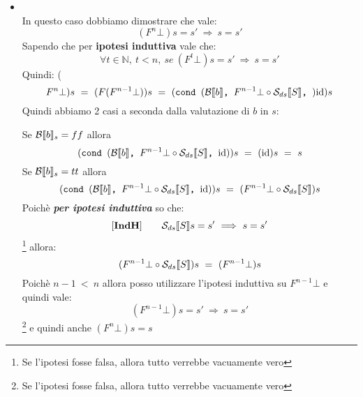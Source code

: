 {\begin{itemize}
\begin{itemize}
    \item {} \\
    In questo caso dobbiamo dimostrare che vale:
    \[ (F^{n}\bot)s=s'~\Longrightarrow~s=s' \]
    Sapendo che per \textbf{ipotesi induttiva} vale che:
    \[ \forall t\in\mathbb{N},~t<n,~se~(F^{t}\bot)s=s'~\Longrightarrow~s=s' \]
    Quindi:
   (\[ F^{n}\bot)s~=~(F(F^{n-1}\bot))s~=~(\cond{b}{F^{n-1}\bot \circ \Sds}
    {\idDS})s \]
    Quindi abbiamo 2 casi a seconda dalla valutazione di $b$ in $s$:

    \subitem[FALSE] Se $\mathcal{B}{}\llbracket b \rrbracket_s=ff$ allora \[ (\mbox{\normalfont{\texttt{cond }}} (\mathcal{B}{}\llbracket b \rrbracket \textrm{\normalfont{\texttt{, }}} F^{n-1}\bot \circ \mathcal{S}_{ds}\llbracket S \rrbracket \textrm{\normalfont{\texttt{, }}} \textrm{\normalfont{id}}))s~=~(\textrm{\normalfont{id}})s~=~s \]
    \subitem[TRUE] Se $\mathcal{B}{}\llbracket b \rrbracket_s=tt$ allora \[ (\mbox{\normalfont{\texttt{cond }}} (\mathcal{B}{}\llbracket b \rrbracket \textrm{\normalfont{\texttt{, }}} F^{n-1}\bot \circ \mathcal{S}_{ds}\llbracket S \rrbracket \textrm{\normalfont{\texttt{, }}} \textrm{\normalfont{id}}))s~=~(F^{n-1}\bot \circ \mathcal{S}_{ds}\llbracket S \rrbracket)s \]
    Poichè \textit{\textbf{per ipotesi induttiva}} so che: 
    \[ \mathbf{[IndH]}\qquad \mathcal{S}_{ds}\llbracket S \rrbracket{}s=s'~\Longrightarrow~s=s' \]\footnote{Se l'ipotesi fosse falsa,
    allora tutto verrebbe vacuamente vero} allora:
    \[
        (F^{n-1}\bot \circ \mathcal{S}_{ds}\llbracket S \rrbracket{})s~=~(F^{n-1}\bot)s
    \]
    Poichè $n-1~<~n$ allora posso utilizzare l'ipotesi induttiva su 
    $F^{n-1}\bot$ e quindi vale: \[ (F^{n-1}\bot)s=s'~\Longrightarrow~s=s' \]
    \footnote{Se l'ipotesi fosse falsa, allora tutto verrebbe vacuamente vero}
    e quindi anche $(F^{n}\bot)s=s$

    \end{itemize}
\end{itemize}
}
\newpage